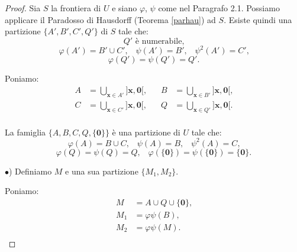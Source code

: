 \documentclass[a4paper,oneside,11pt]{book}
\theoremstyle{definition} \newtheorem{Def}{Definizione}
\theoremstyle{plain} \newtheorem{teo}{Teorema}
\theoremstyle{plain} \newtheorem{cor}[teo]{Corollario}
\theoremstyle{definition} \newtheorem{lem}[teo]{Lemma}
\theoremstyle{plain} \newtheorem{pro}[teo]{Proposizione}
\begin{document}
	\begin{proof}
		Sia $S$ la frontiera di $U$ e siano $\varphi$, $\psi$ come nel Paragrafo 2.1. Possiamo applicare il Paradosso di Hausdorff (Teorema \ref{parhau}) ad $S$. Esiste quindi una partizione $\{A', B', C', Q'\}$ di $S$ tale che:
		\begin{equation*}
			Q' \text{ è numerabile} \text{,}
		\end{equation*}
		\begin{equation*}
			\varphi(A') = B' \cup C' \text{,} \quad \psi(A') = B' \text{,} \quad \psi^2(A') = C' \text{,}
		\end{equation*}
		\begin{equation*}
			\varphi(Q') = \psi(Q') = Q' \text{.}
		\end{equation*}
		
		Poniamo:
		\begin{equation*}
			\begin{aligned} %
				A &= \bigcup_{\mathbf{x} \in A'} ]\mathbf{x}, \mathbf{0}[ \text{,} &\quad 
				B &= \bigcup_{\mathbf{x} \in B'} ]\mathbf{x}, \mathbf{0}[ \text{,} \\
				C &= \bigcup_{\mathbf{x} \in C'} ]\mathbf{x}, \mathbf{0}[ \text{,} &\quad
				Q &= \bigcup_{\mathbf{x} \in Q'} ]\mathbf{x}, \mathbf{0}[ \text{.} \\%
			\end{aligned}
		\end{equation*}
		
		La famiglia $\{A, B, C, Q, \{\mathbf{0}\}\}$ è una partizione di $U$ tale che:
		\begin{equation*}
			\varphi(A) = B \cup C \text{,} \quad \psi(A) = B \text{,} \quad \psi^2(A) = C \text{,}
		\end{equation*}
		\begin{equation*}
			\varphi(Q) = \psi(Q) = Q \text{,} \quad \varphi(\{\mathbf{0}\}) = \psi(\{\mathbf{0}\}) = \{\mathbf{0}\} \text{.}
		\end{equation*}
		
		$\bullet$) Definiamo $M$ e una sua partizione $\{M_1, M_2\}$.
		
		Poniamo:
		\begin{equation*}
			\begin{aligned}
				M &= A \cup Q \cup \{\mathbf{0}\} \text{,}\\
				M_1 &= \varphi\psi(B) \text{,}\\
				M_2 &= \varphi\psi(M) \text{.}\\
			\end{aligned}
		\end{equation*}
		

\end{proof}
\end{document}
